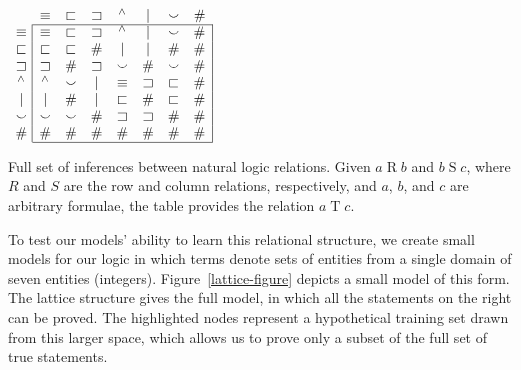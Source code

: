 \begin{table}[htp]
  \centering  
  \setlength{\arraycolsep}{12pt}
  \renewcommand{\arraystretch}{1.1}
  \newcommand{\rcg}{}
  $\begin{array}[t]{c@{ \ }|*{7}{c}|}
    \multicolumn{1}{c}{}
             & \nateq     & \natfor     & \natrev     & \natneg    & \natalt     & \natcov     & \multicolumn{1}{c}{\natind} \\
    \cline{2-8}
    \nateq   & \rcg\nateq & \natfor     & \natrev     & \natneg    & \natalt     & \natcov     & \natind\\
    \natfor  & \natfor    & \rcg\natfor & \natind     & \natalt    & \natalt     & \natind     & \natind\\
    \natrev  & \natrev    & \natind     & \rcg\natrev & \natcov    & \natind     & \natcov     & \natind\\
    \natneg  & \natneg    & \natcov     & \natalt     & \rcg\nateq & \natrev     & \natfor     & \natind\\
    \natalt  & \natalt    & \natind     & \natalt     & \natfor    & \rcg\natind & \natfor     & \natind\\
    \natcov  & \natcov    & \natcov     & \natind     & \natrev    & \natrev     & \rcg\natind & \natind\\
    \natind  & \natind    & \natind     & \natind     & \natind    & \natind     & \natind     & \rcg\natind \\
    \cline{2-8}
  \end{array}$
  \caption{Full set of inferences between natural logic relations.
    Given $a \mathbin{R} b$ and $b \mathbin{S} c$, where $R$ and $S$
    are the row and column relations, respectively, and $a$, $b$, and
    $c$ are arbitrary formulae, the table provides the relation
    $a \mathbin{T} c$.}
  \label{tab:jointable}
\end{table}

To test our models' ability to learn this relational structure, we
create small models for our logic in which terms denote sets of
entities from a single domain of seven entities (integers).
Figure~\ref{lattice-figure} depicts a small model of this form. The
lattice structure gives the full model, in which all the statements on
the right can be proved. The highlighted nodes represent a
hypothetical training set drawn from this larger space, which allows
us to prove only a subset of the full set of true statements.

